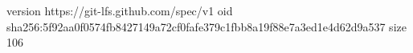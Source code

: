 version https://git-lfs.github.com/spec/v1
oid sha256:5f92aa0f0574fb8427149a72cf0fafe379c1fbb8a19f88e7a3ed1e4d62d9a537
size 106
